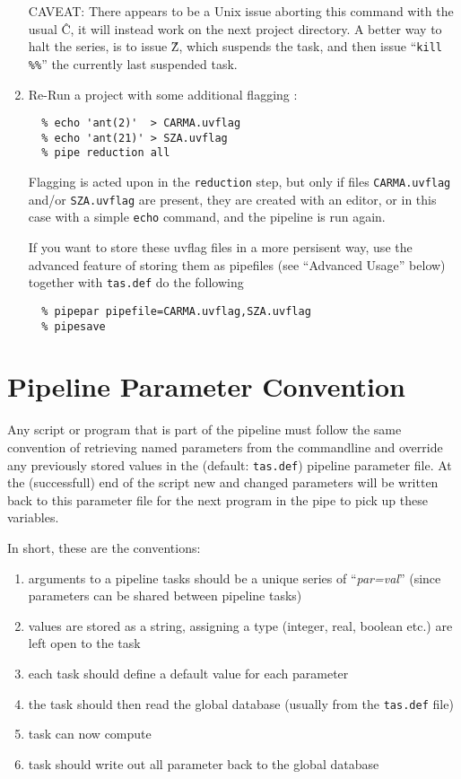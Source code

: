 \documentclass[preprint]{aastex} %
\begin{document}
\begin{enumerate}
CAVEAT: There appears to be a Unix issue aborting this command with the usual \^C,
it will instead work on the next project directory. A better way to halt the
series, is to issue \^Z, which suspends the task, and then issue 
``{\tt kill \%\%}'' the currently last suspended task.

\item
Re-Run a project with some additional flagging :
\footnotesize
\begin{verbatim}
  % echo 'ant(2)'  > CARMA.uvflag
  % echo 'ant(21)' > SZA.uvflag
  % pipe reduction all
\end{verbatim}
\normalsize

Flagging is acted upon in the {\tt reduction} step, but
only if files {\tt CARMA.uvflag} and/or
{\tt SZA.uvflag} are present, they are created with an editor, or
in this case with a simple {\tt echo} command, and the pipeline
is run again.

If you want to store these uvflag files in a more
persisent way, use the advanced feature of
storing them as pipefiles (see ``Advanced Usage'' below) together
with {\tt tas.def} do the following

\footnotesize
\begin{verbatim}
  % pipepar pipefile=CARMA.uvflag,SZA.uvflag
  % pipesave 
\end{verbatim}
\normalsize

\end{enumerate}


\section{Pipeline Parameter Convention}

Any script or program that is part of the pipeline
must follow the same convention of retrieving named
parameters from the commandline and override any previously stored
values in the (default: {\tt tas.def}) pipeline parameter file.
At the (successfull) end of the script new and changed parameters
will be written back to this parameter file for the next program in
the pipe to pick up these variables.

In short, these are the conventions:

\begin{enumerate}
\item
arguments to a pipeline tasks should be a unique series of ``{\it par=val}''
(since parameters can be shared between pipeline tasks)
\item
values are stored as a string, assigning a type (integer, real, boolean etc.) are
left open to the task
\item
each task should define a default value for each parameter
\item
the task should then read the global database (usually from the {\tt tas.def} file)
\item
task can now compute
\item
task should write out all parameter back to the global database
\end{enumerate}
\end{document}
